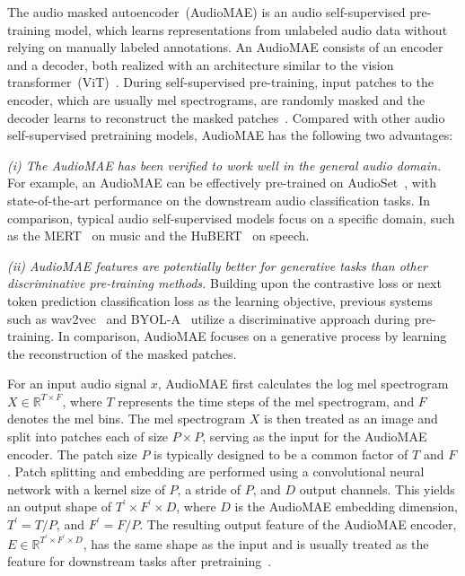 \documentclass[lettersize,journal]{IEEEtran}
\begin{document}
The audio masked autoencoder~(AudioMAE) is an audio self-supervised pre-training model, which learns representations from unlabeled audio data without relying on manually labeled annotations. An AudioMAE consists of an encoder and a decoder, both realized with an architecture similar to the vision transformer~(ViT)~\cite{dosovitskiy2020image}. During self-supervised pre-training, input patches to the encoder, which are usually mel spectrograms, are randomly masked and the decoder learns to reconstruct the masked patches~\cite{xu2022masked}. Compared with other audio self-supervised pretraining models, AudioMAE has the following two advantages: 

\textit{(i) The AudioMAE has been verified to work well in the general audio domain.} For example, an AudioMAE can be effectively pre-trained on AudioSet~\cite{gemmeke2017audio}, with state-of-the-art performance on the downstream audio classification tasks. In comparison, typical audio self-supervised models focus on a specific domain, such as the MERT~\cite{li2023mert} on music and the HuBERT~\cite{hsu2021hubert} on speech. 


\textit{(ii) AudioMAE features are potentially better for generative tasks than other discriminative pre-training methods.} Building upon the contrastive loss or next token prediction classification loss as the learning objective, previous systems such as wav2vec~\cite{schneider2019wav2vec} and BYOL-A~\cite{niizumi2021byol} utilize a discriminative approach during pre-training. In comparison, AudioMAE focuses on a generative process by learning the reconstruction of the masked patches. 


For an input audio signal $x$, AudioMAE first calculates the log mel spectrogram $X\in \mathbb{R}^{T\times F}$, where $T$ represents the time steps of the mel spectrogram, and $F$ denotes the mel bins. The mel spectrogram $X$ is then treated as an image and split into patches each of size $P\times P$, serving as the input for the AudioMAE encoder. The patch size $P$ is typically designed to be a common factor of $T$ and $F$. Patch splitting and embedding are performed using a convolutional neural network with a kernel size of $P$, a stride of $P$, and $D$ output channels. This yields an output shape of $T^{\prime}\times F^{\prime}\times D$, where $D$ is the AudioMAE embedding dimension, $T^{\prime}=T/P$, and $F^{\prime}=F/P$. The resulting output feature of the AudioMAE encoder, $E\in \mathbb{R}^{T^{\prime}\times F^{\prime}\times D}$, has the same shape as the input and is usually treated as the feature for downstream tasks after pretraining~\cite{xu2022masked}. 
\end{document}

